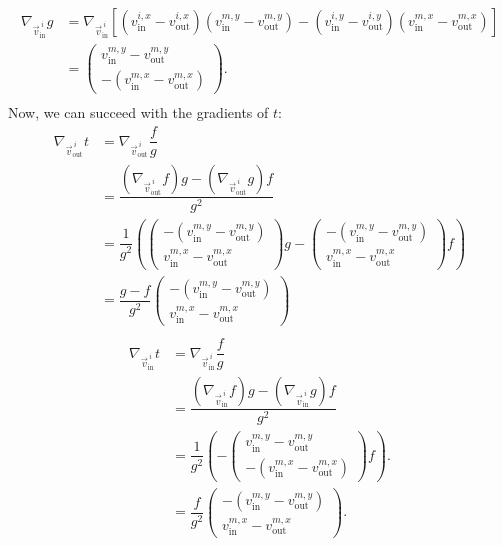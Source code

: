 \begin{proposition}
	\begin{align*}
		\nabla_{\vec{v}_{\text{in}}^{\: i}} g
		&= \nabla_{\vec{v}_{\text{in}}^{\: i}}[(v_{\text{in}}^{i, x} - v_{\text{out}}^{i, x})(v_{\text{in}}^{m, y} - v_{\text{out}}^{m, y}) - (v_{\text{in}}^{i, y} - v_{\text{out}}^{i, y})(v_{\text{in}}^{m, x} - v_{\text{out}}^{m, x})] \\[0.5em]
		&= \begin{pmatrix}
			v_{\text{in}}^{m, y} - v_{\text{out}}^{m, y} \\[0.5em]
			-(v_{\text{in}}^{m, x} - v_{\text{out}}^{m, x})
		\end{pmatrix}. \\[2em]
	\end{align*}
	Now, we can succeed with the gradients of $t$:
	\begin{align*}
		\nabla_{\vec{v}_{\text{out}}^{\: i}} t
		&= \nabla_{\vec{v}_{\text{out}}^{\: i}} \dfrac{f}{g} \\
		&= \dfrac{(\nabla_{\vec{v}_{\text{out}}^{\: i}} f) g - (\nabla_{\vec{v}_{\text{out}}^{\: i}} g) f}{g^2} \\[0.5em]
		&= \dfrac{1}{g^2} \left(\begin{pmatrix}
			-(v_{\text{in}}^{m, y} - v_{\text{out}}^{m, y}) \\[0.5em]
			 v_{\text{in}}^{m, x} - v_{\text{out}}^{m, x}
		\end{pmatrix} g - \begin{pmatrix}
			-(v_{\text{in}}^{m, y} - v_{\text{out}}^{m, y}) \\[0.5em]
			 v_{\text{in}}^{m, x} - v_{\text{out}}^{m, x}
		\end{pmatrix} f\right)\\[0.5em]
		&= \dfrac{g - f}{g^2} \begin{pmatrix}
			-(v_{\text{in}}^{m, y} - v_{\text{out}}^{m, y}) \\[0.5em]
			 v_{\text{in}}^{m, x} - v_{\text{out}}^{m, x}
		\end{pmatrix}\\[1em]
	\end{align*}
	\begin{align*}	
		\nabla_{\vec{v}_{\text{in}}^{\: i}} t
		&= \nabla_{\vec{v}_{\text{in}}^{\: i}} \dfrac{f}{g} \\
		&= \dfrac{(\nabla_{\vec{v}_{\text{in}}^{\: i}} f) g - (\nabla_{\vec{v}_{\text{in}}^{\: i}} g) f}{g^2} \\[0.5em]
		&= \dfrac{1}{g^2} \left( - \begin{pmatrix}
			v_{\text{in}}^{m, y} - v_{\text{out}}^{m, y} \\[0.5em]
			-(v_{\text{in}}^{m, x} - v_{\text{out}}^{m, x})
		\end{pmatrix} f\right). \\[0.5em]
		&= \dfrac{f}{g^2} \begin{pmatrix}
			-(v_{\text{in}}^{m, y} - v_{\text{out}}^{m, y}) \\[0.5em]
			v_{\text{in}}^{m, x} - v_{\text{out}}^{m, x}
		\end{pmatrix}. \\[0.5em]
	\end{align*}


\end{proposition}
